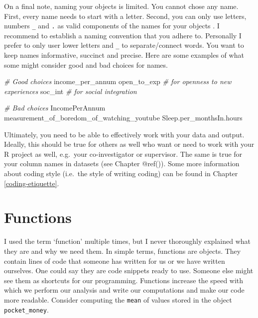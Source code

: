 \documentclass[
]{book}
\newenvironment{Shaded}{\begin{snugshade}}{\end{snugshade}}
\newcommand{\CommentTok}[1]{\textcolor[rgb]{0.56,0.35,0.01}{\textit{#1}}}
\newcommand{\NormalTok}[1]{#1}
\begin{document}
On a final note, naming your objects is limited. You cannot chose any name. First, every name needs to start with a letter. Second, you can only use letters, numbers \texttt{\_} and \texttt{.} as valid components of the names for your objects \citep[see also][Chapter 4.2.]{wickham2016r}. I recommend to establish a naming convention that you adhere to. Personally I prefer to only user lower letters and \texttt{\_} to separate/connect words. You want to keep names informative, succinct and precise. Here are some examples of what some might consider good and bad choices for names.

\begin{Shaded}
\begin{Highlighting}[]
\CommentTok{\# Good choices}
\NormalTok{income\_per\_annum}
\NormalTok{open\_to\_exp          }\CommentTok{\# for \textquotesingle{}openness to new experiences\textquotesingle{}}
\NormalTok{soc\_int              }\CommentTok{\# for \textquotesingle{}social integration\textquotesingle{}}
 
\CommentTok{\# Bad choices}
\NormalTok{IncomePerAnnum}
\NormalTok{measurement\_of\_boredom\_of\_watching\_youtube}
\NormalTok{Sleep.per\_monthsIn.hours}
\end{Highlighting}
\end{Shaded}

Ultimately, you need to be able to effectively work with your data and output. Ideally, this should be true for others as well who want or need to work with your R project as well, e.g.~your co-investigator or supervisor. The same is true for your column names in datasets (see Chapter @ref()). Some more information about coding style (i.e.~the style of writing coding) can be found in Chapter \ref{coding-etiquette}.

\hypertarget{functions}{%
\section{Functions}\label{functions}}

I used the term `function' multiple times, but I never thoroughly explained what they are and why we need them. In simple terms, functions are objects. They contain lines of code that someone has written for us or we have written ourselves. One could say they are code snippets ready to use. Someone else might see them as shortcuts for our programming. Functions increase the speed with which we perform our analysis and write our computations and make our code more readable. Consider computing the \texttt{mean} of values stored in the object \texttt{pocket\_money}.
\end{document}
